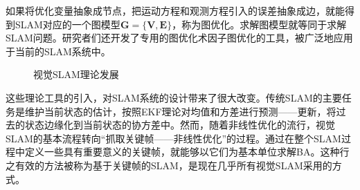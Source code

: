 如果将优化变量抽象成节点，把运动方程和观测方程引入的误差抽象成边，就能得到SLAM对应的一个图模型$\boldsymbol{G}=\lbrace \boldsymbol{V}, \boldsymbol{E} \rbrace$，称为图优化\upcite{}。求解图模型就等同于求解SLAM问题。研究者们还开发了专用的图优化术因子图优化的工具\upcite{}，被广泛地应用于当前的SLAM系统中。


\begin{figure}
    \centering
     \caption{视觉SLAM理论发展}
\label{fig1.1}
\end{figure}


这些理论工具的引入，对SLAM系统的设计带来了很大改变。传统SLAM的主要任务是维护当前状态的估计，按照EKF理论对均值和方差进行预测——更新，将过去的状态边缘化到当前状态的协方差中。然而，随着非线性优化的流行，视觉SLAM的基本流程转向“抓取关键帧——非线性优化”的过程。通过在整个SLAM过程中定义一些具有重要意义的关键帧，就能够以它们为基本单位求解BA。这种行之有效的方法被称为基于关键帧的SLAM，是现在几乎所有视觉SLAM采用的方式\upcite{}。




